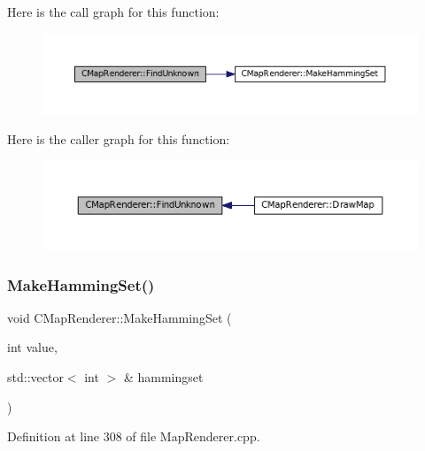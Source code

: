Here is the call graph for this function\+:
\nopagebreak
\begin{figure}[H]
\begin{center}
\leavevmode
\includegraphics[width=350pt]{classCMapRenderer_aec3c1d3294ac3af8ebb717ed5be88870_cgraph}
\end{center}
\end{figure}
Here is the caller graph for this function\+:
\nopagebreak
\begin{figure}[H]
\begin{center}
\leavevmode
\includegraphics[width=350pt]{classCMapRenderer_aec3c1d3294ac3af8ebb717ed5be88870_icgraph}
\end{center}
\end{figure}
\hypertarget{classCMapRenderer_a0b06ba89b9a7ad75fa945a3c22dc019a}{}\label{classCMapRenderer_a0b06ba89b9a7ad75fa945a3c22dc019a} 
\subsubsection{\texorpdfstring{Make\+Hamming\+Set()}{MakeHammingSet()}}
{\footnotesize\ttfamily void C\+Map\+Renderer\+::\+Make\+Hamming\+Set (\begin{DoxyParamCaption}\item[{int}]{value,  }\item[{std\+::vector$<$ int $>$ \&}]{hammingset }\end{DoxyParamCaption})\hspace{0.3cm}{\ttfamily [protected]}}



Definition at line 308 of file Map\+Renderer.\+cpp.


